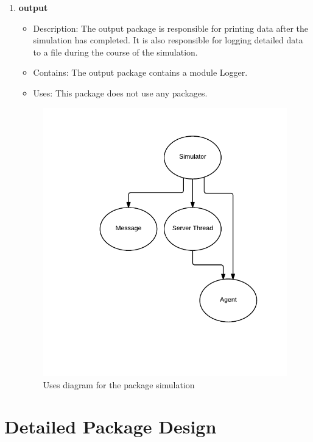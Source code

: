 \begin{enumerate}
\item\textbf{output}
\begin{itemize}
\item Description: The output package is responsible for printing data after the simulation has completed. It is also responsible for logging detailed data to a file during the course of the simulation.
\item Contains: The output package contains a module Logger.
\item Uses: This package does not use any packages.
\end{itemize}

\begin{figure}[H]
\centering
\includegraphics[width=4.5in]{figs/simPackage}
\caption{Uses diagram for the package simulation}
\label{fig:simulation}
\end{figure}

\end{enumerate}

\section{Detailed Package Design}

